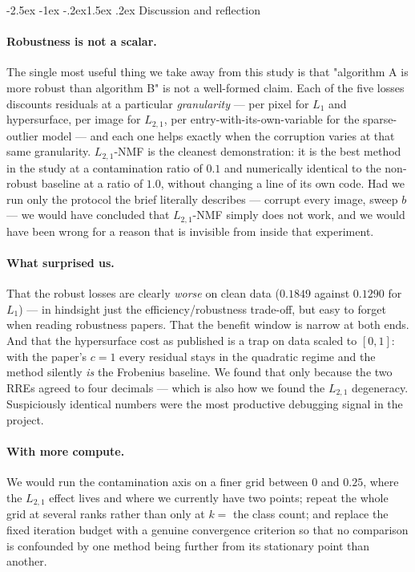 \documentclass[12pt,a4paper]{article}
\makeatletter
\renewcommand\subsection{\@startsection{subsection}{2}{\z@}%
    {-2.5ex \@plus -1ex \@minus -.2ex}{1.5ex \@plus.2ex}%
    {\normalfont\fontsize{12}{14}\bfseries}}
\makeatother
\begin{document}
\subsection{Discussion and reflection}
\paragraph{Robustness is not a scalar.} The single most useful thing we take
away from this study is that "algorithm A is more robust than algorithm B" is
not a well-formed claim. Each of the five losses discounts residuals at a
particular \emph{granularity} --- per pixel for $L_1$ and hypersurface, per
image for $L_{2,1}$, per entry-with-its-own-variable for the sparse-outlier
model --- and each one helps exactly when the corruption varies at that same
granularity. $L_{2,1}$-NMF is the cleanest demonstration: it is the best method
in the study at a contamination ratio of $0.1$ and numerically identical to the
non-robust baseline at a ratio of $1.0$, without changing a line of its own
code. Had we run only the protocol the brief literally describes --- corrupt
every image, sweep $b$ --- we would have concluded that $L_{2,1}$-NMF simply
does not work, and we would have been wrong for a reason that is invisible from
inside that experiment.

\paragraph{What surprised us.} That the robust losses are clearly \emph{worse}
on clean data ($0.1849$ against $0.1290$ for $L_1$) --- in hindsight just the
efficiency/robustness trade-off, but easy to forget when reading robustness
papers. That the benefit window is narrow at both ends. And that the
hypersurface cost as published is a trap on data scaled to $[0,1]$: with the
paper's $c=1$ every residual stays in the quadratic regime and the method
silently \emph{is} the Frobenius baseline. We found that only because the two
RREs agreed to four decimals --- which is also how we found the $L_{2,1}$
degeneracy. Suspiciously identical numbers were the most productive debugging
signal in the project.

\paragraph{With more compute.} We would run the contamination axis on a finer
grid between $0$ and $0.25$, where the $L_{2,1}$ effect lives and where we
currently have two points; repeat the whole grid at several ranks rather than
only at $k = $ the class count; and replace the fixed iteration budget with a
genuine convergence criterion so that no comparison is confounded by one method
being further from its stationary point than another.
\end{document}

